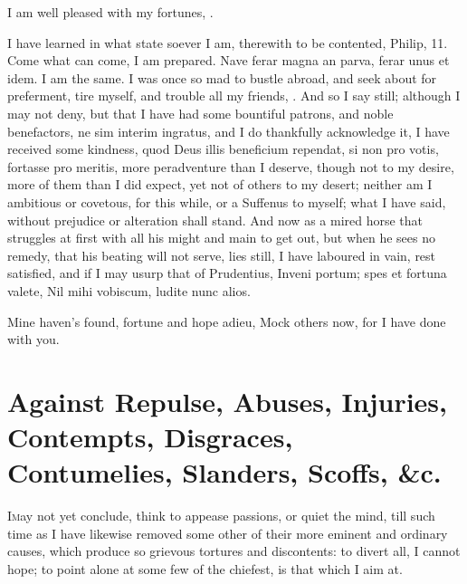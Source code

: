 {I am well pleased with my fortunes, .

I have learned in what state soever I am, therewith to be contented,
Philip,  11. Come what can come, I am prepared. Nave ferar magna an
parva, ferar unus et idem. I am the same. I was once so mad to bustle
abroad, and seek about for preferment, tire myself, and trouble all my
friends, . And so I say still; although I may not
deny, but that I have had some  bountiful patrons, and noble
benefactors, ne sim interim ingratus, and I do thankfully acknowledge
it, I have received some kindness, quod Deus illis beneficium rependat,
si non pro votis, fortasse pro meritis, more peradventure than I
deserve, though not to my desire, more of them than I did expect, yet
not of others to my desert; neither am I ambitious or covetous, for
this while, or a Suffenus to myself; what I have said, without
prejudice or alteration shall stand. And now as a mired horse that
struggles at first with all his might and main to get out, but when he
sees no remedy, that his beating will not serve, lies still, I have
laboured in vain, rest satisfied, and if I may usurp that of
Prudentius,
Inveni portum; spes et fortuna valete,
Nil mihi vobiscum, ludite nunc alios.

Mine haven's found, fortune and hope adieu,
Mock others now, for I have done with you.



\section[Against Repulse, Abuses, Injuries \ldots{}]{Against Repulse, Abuses, Injuries, Contempts, Disgraces, Contumelies, Slanders, Scoffs, \&c.}

\lettrine{I} may not yet conclude, think to appease passions, or quiet the mind,
till such time as I have likewise removed some other of their more
eminent and ordinary causes, which produce so grievous tortures and
discontents: to divert all, I cannot hope; to point alone at some few
of the chiefest, is that which I aim at.

}
